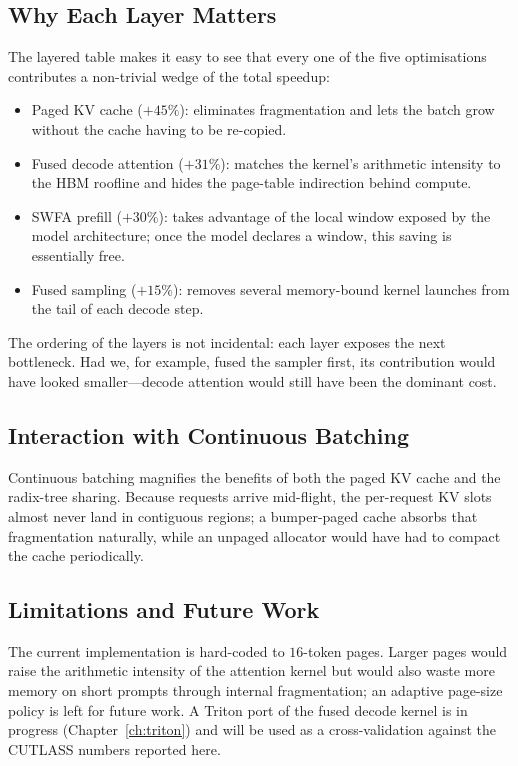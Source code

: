 \subsection{Why Each Layer Matters}\label{sec:sglang_why}
The layered table makes it easy to see that every one of the
five optimisations contributes a non-trivial wedge of the total
speedup:
\begin{itemize}
    \item Paged KV cache ($+45\%$): eliminates fragmentation and
          lets the batch grow without the cache having to be
          re-copied.
    \item Fused decode attention ($+31\%$): matches the kernel's
          arithmetic intensity to the HBM roofline and hides the
          page-table indirection behind compute.
    \item SWFA prefill ($+30\%$): takes advantage of the local
          window exposed by the model architecture; once the
          model declares a window, this saving is essentially
          free.
    \item Fused sampling ($+15\%$): removes several memory-bound
          kernel launches from the tail of each decode step.
\end{itemize}
The ordering of the layers is not incidental: each layer exposes
the next bottleneck. Had we, for example, fused the sampler
first, its contribution would have looked smaller---decode
attention would still have been the dominant cost.

\subsection{Interaction with Continuous Batching}\label{sec:sglang_cb}
Continuous batching magnifies the benefits of both the paged KV
cache and the radix-tree sharing. Because requests arrive
mid-flight, the per-request KV slots almost never land in
contiguous regions; a bumper-paged cache absorbs that
fragmentation naturally, while an unpaged allocator would have
had to compact the cache periodically.

\subsection{Limitations and
Future Work}\label{sec:sglang_limits}
The current implementation is hard-coded to $16$-token pages.
Larger pages would raise the arithmetic intensity of the
attention kernel but would also waste more memory on short
prompts through internal fragmentation; an adaptive page-size
policy is left for future work. A Triton port of the fused
decode kernel is in progress (Chapter~\ref{ch:triton}) and will
be used as a cross-validation against the CUTLASS numbers
reported here.

